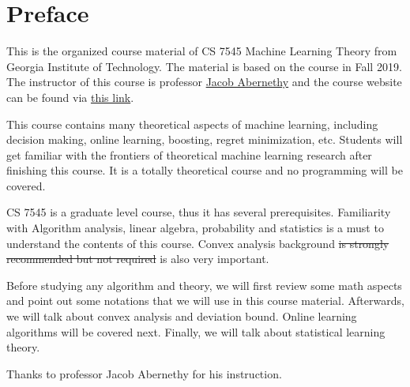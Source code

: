 \documentclass[main.tex]{subfiles}
\begin{document}
\chapter*{Preface}

This is the organized course material of CS 7545 Machine Learning Theory from Georgia Institute of Technology. The material is based on the course in Fall 2019. The instructor of this course is professor \href{https://www.cc.gatech.edu/~jabernethy9/}{Jacob Abernethy} and the course website can be found via \href{https://mltheory.github.io/CS7545/}{this link}.

This course contains many theoretical aspects of machine learning, including decision making, online learning, boosting, regret minimization, etc. Students will get familiar with the frontiers of theoretical machine learning research after finishing this course. It is a totally theoretical course and no programming will be covered.

CS 7545 is a graduate level course, thus it has several prerequisites. Familiarity with Algorithm analysis, linear algebra, probability and statistics is a must to understand the contents of this course. Convex analysis background \sout{is strongly recommended but not required} is also very important.

Before studying any algorithm and theory, we will first review some math aspects and point out some notations that we will use in this course material. Afterwards, we will talk about convex analysis and deviation bound. Online learning algorithms will be covered next. Finally, we will talk about statistical learning theory. 

Thanks to professor Jacob Abernethy for his instruction.
\end{document}
